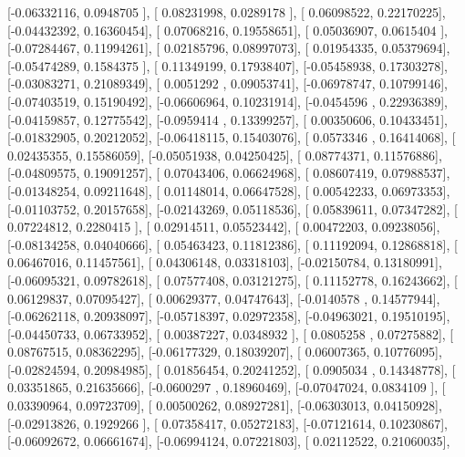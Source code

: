 \documentclass{article}
\begin{document}
       [-0.06332116,  0.0948705 ],
       [ 0.08231998,  0.0289178 ],
       [ 0.06098522,  0.22170225],
       [-0.04432392,  0.16360454],
       [ 0.07068216,  0.19558651],
       [ 0.05036907,  0.0615404 ],
       [-0.07284467,  0.11994261],
       [ 0.02185796,  0.08997073],
       [ 0.01954335,  0.05379694],
       [-0.05474289,  0.1584375 ],
       [ 0.11349199,  0.17938407],
       [-0.05458938,  0.17303278],
       [-0.03083271,  0.21089349],
       [ 0.0051292 ,  0.09053741],
       [-0.06978747,  0.10799146],
       [-0.07403519,  0.15190492],
       [-0.06606964,  0.10231914],
       [-0.0454596 ,  0.22936389],
       [-0.04159857,  0.12775542],
       [-0.0959414 ,  0.13399257],
       [ 0.00350606,  0.10433451],
       [-0.01832905,  0.20212052],
       [-0.06418115,  0.15403076],
       [ 0.0573346 ,  0.16414068],
       [ 0.02435355,  0.15586059],
       [-0.05051938,  0.04250425],
       [ 0.08774371,  0.11576886],
       [-0.04809575,  0.19091257],
       [ 0.07043406,  0.06624968],
       [ 0.08607419,  0.07988537],
       [-0.01348254,  0.09211648],
       [ 0.01148014,  0.06647528],
       [ 0.00542233,  0.06973353],
       [-0.01103752,  0.20157658],
       [-0.02143269,  0.05118536],
       [ 0.05839611,  0.07347282],
       [ 0.07224812,  0.2280415 ],
       [ 0.02914511,  0.05523442],
       [ 0.00472203,  0.09238056],
       [-0.08134258,  0.04040666],
       [ 0.05463423,  0.11812386],
       [ 0.11192094,  0.12868818],
       [ 0.06467016,  0.11457561],
       [ 0.04306148,  0.03318103],
       [-0.02150784,  0.13180991],
       [-0.06095321,  0.09782618],
       [ 0.07577408,  0.03121275],
       [ 0.11152778,  0.16243662],
       [ 0.06129837,  0.07095427],
       [ 0.00629377,  0.04747643],
       [-0.0140578 ,  0.14577944],
       [-0.06262118,  0.20938097],
       [-0.05718397,  0.02972358],
       [-0.04963021,  0.19510195],
       [-0.04450733,  0.06733952],
       [ 0.00387227,  0.0348932 ],
       [ 0.0805258 ,  0.07275882],
       [ 0.08767515,  0.08362295],
       [-0.06177329,  0.18039207],
       [ 0.06007365,  0.10776095],
       [-0.02824594,  0.20984985],
       [ 0.01856454,  0.20241252],
       [ 0.0905034 ,  0.14348778],
       [ 0.03351865,  0.21635666],
       [-0.0600297 ,  0.18960469],
       [-0.07047024,  0.0834109 ],
       [ 0.03390964,  0.09723709],
       [ 0.00500262,  0.08927281],
       [-0.06303013,  0.04150928],
       [-0.02913826,  0.1929266 ],
       [ 0.07358417,  0.05272183],
       [-0.07121614,  0.10230867],
       [-0.06092672,  0.06661674],
       [-0.06994124,  0.07221803],
       [ 0.02112522,  0.21060035],
\end{document}
